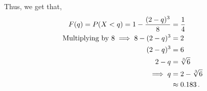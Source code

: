 \begin{subquestions}
\begin{subsubquestions}
Thus, we get that,
\begin{align}
	F(q) = P(X<q) = 1 - \frac{(2-q)^3}{8} & = \frac{1}{4} \nonumber \\
	                \text{Multiplying by 8} \implies 8 - (2-q)^3 & = 2 \nonumber \\
	                (2-q)^3 & = 6 \nonumber \\
	                2-q & = \sqrt[3]{6} \nonumber \\
	                \implies q & = 2 - \sqrt[3]{6} \nonumber \\
	                & \approx 0.183 \,.
\end{align}

\end{subsubquestions}

\end{subquestions}



